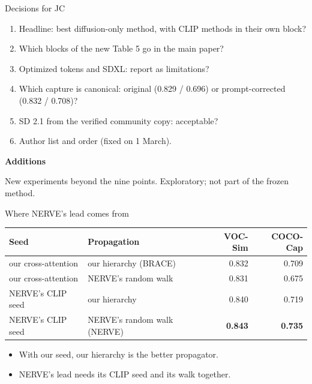 \documentclass[aspectratio=169,11pt]{beamer}
\newcommand{\partcover}[2]{%
\begin{frame}[plain]
\vfill
\begin{center}
{\LARGE\bfseries #1}\par\vspace{1em}
\begin{minipage}{0.78\linewidth}\centering #2\end{minipage}
\end{center}
\vfill
\end{frame}}
\begin{document}
\begin{frame}{Decisions for JC}
\begin{enumerate}
\item Headline: best diffusion-only method, with CLIP methods in their own block?
\item Which blocks of the new Table 5 go in the main paper?
\item Optimized tokens and SDXL: report as limitations?
\item Which capture is canonical: original (0.829 / 0.696) or prompt-corrected (0.832 / 0.708)?
\item SD 2.1 from the verified community copy: acceptable?
\item Author list and order (fixed on 1 March).
\end{enumerate}
\end{frame}

\partcover{Additions}{New experiments beyond the nine points. Exploratory; not part of the frozen method.}

\begin{frame}{Where NERVE's lead comes from}
\begin{slidetable}
\begin{tabular}{@{}llrr@{}}
\toprule
Seed & Propagation & VOC-Sim & COCO-Cap \\
\midrule
our cross-attention & our hierarchy (BRACE) & 0.832 & 0.709 \\
our cross-attention & NERVE's random walk & 0.831 & 0.675 \\
NERVE's CLIP seed & our hierarchy & 0.840 & 0.719 \\
NERVE's CLIP seed & NERVE's random walk (NERVE) & \textbf{0.843} & \textbf{0.735} \\
\bottomrule
\end{tabular}
\end{slidetable}
\begin{itemize}
\item With our seed, our hierarchy is the better propagator.
\item NERVE's lead needs its CLIP seed and its walk together.
\end{itemize}
\end{frame}
\end{document}
